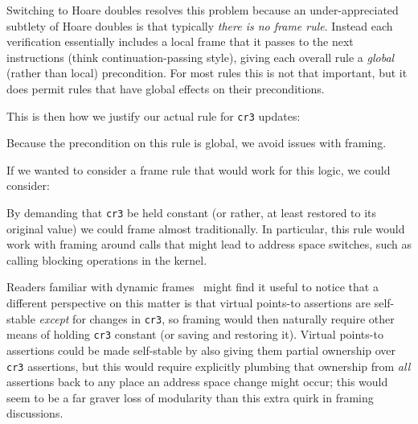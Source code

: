 Switching to Hoare doubles resolves this problem because an under-appreciated subtlety of Hoare doubles is that typically \emph{there is no frame rule}. Instead each verification essentially includes a local frame that it passes to the next instructions (think continuation-passing style), giving each overall rule a \emph{global} (rather than local) precondition. For most rules this is not that important, but it does permit rules that have global effects on their preconditions.

This is then how we justify our actual rule for \lstinline|cr3| updates:
\begin{mathpar}
\end{mathpar}
Because the precondition on this rule is global, we avoid issues with framing.

If we wanted to consider a frame rule that would work for this logic, we could consider:
\begin{mathpar}
\end{mathpar}
By demanding that \lstinline|cr3| be held constant (or rather, at least restored to its original value) we could frame almost traditionally. In particular, this rule would work with framing around calls that might lead to address space switches, such as calling blocking operations in the kernel.

Readers familiar with dynamic frames~\cite{parkinson2011relationship} might find it useful to notice that a different perspective on this matter is that virtual points-to assertions are self-stable \emph{except} for changes in \lstinline|cr3|, so framing would then naturally require other means of holding \lstinline|cr3| constant (or saving and restoring it).
Virtual points-to assertions could be made self-stable by also giving them partial ownership over \lstinline|cr3| assertions, but this would require explicitly plumbing that ownership from \emph{all} assertions back to any place an address space change might occur; this would seem to be a far graver loss of modularity than this extra quirk in framing discussions.
